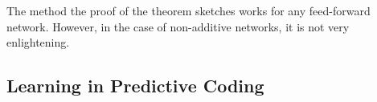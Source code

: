 \documentclass[a4paper,11pt]{report}
\newcommand{\const}{\varsigma} %
\newcommand{\var}{\chi} %
\newcommand{\In}{\text{Init}}
\begin{document}
\begin{Par}
The method the proof of the theorem sketches works for any feed-forward network. However, in the case of non-additive networks, it is not very enlightening.
\end{Par}

%

\subsection{Learning in Predictive Coding}\label{subsec:theory-learning-predicode}
\end{document}
